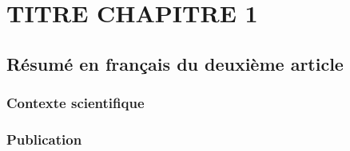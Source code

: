 \chapter{TITRE CHAPITRE 1}
\label{chap1}

\section{Résumé en français du deuxième article}

\subsection{Contexte scientifique}

\subsection{Publication}

